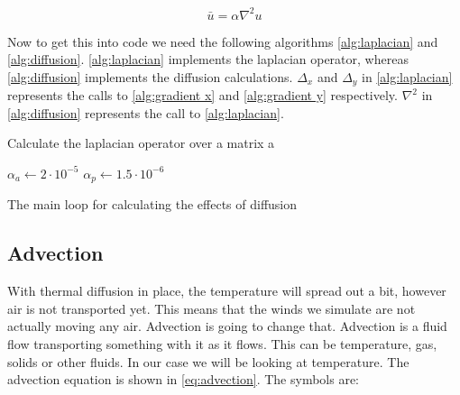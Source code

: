 \begin{equation}
    \bar{u} = \alpha \nabla^2 u
    \label{eq:diffusion}
\end{equation}

Now to get this into code we need the following algorithms \autoref{alg:laplacian} and \autoref{alg:diffusion}. \autoref{alg:laplacian} implements the laplacian operator, whereas 
\autoref{alg:diffusion} implements the diffusion calculations. $\Delta_x$ and $\Delta_y$ in \autoref{alg:laplacian} represents the calls to \autoref{alg:gradient x} and \autoref{alg:gradient y} 
respectively. $\nabla^2$ in \autoref{alg:diffusion} represents the call to \autoref{alg:laplacian}.

\begin{algorithm}
     \;
    \caption{Calculate the laplacian operator over a matrix a}
    \label{alg:laplacian}
\end{algorithm}

\begin{algorithm}
    $\alpha_a \leftarrow 2 \cdot 10^{-5}$ \;
    $\alpha_p \leftarrow 1.5 \cdot 10^{-6}$ \;
    \caption{The main loop for calculating the effects of diffusion}
    \label{alg:diffusion}
\end{algorithm}

\subsection{Advection}
With thermal diffusion in place, the temperature will spread out a bit, however air is not transported yet. This means that the winds we simulate are not actually moving any air. Advection is
going to change that. Advection is a fluid flow transporting something with it as it flows. This can be temperature, gas, solids or other fluids. In our case we will be looking at temperature.
The advection equation is shown in \autoref{eq:advection}. The symbols are:

